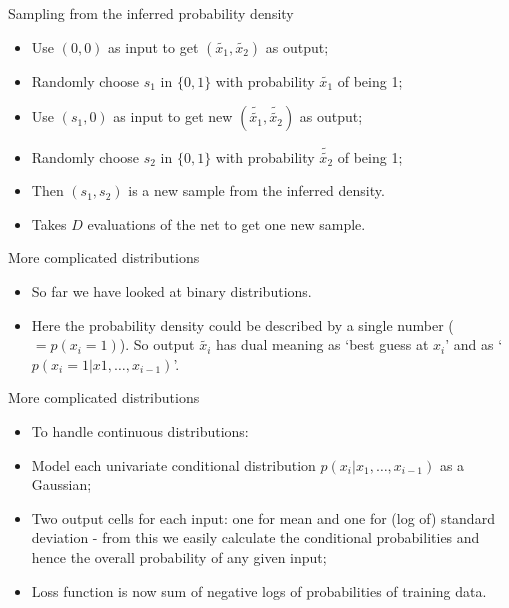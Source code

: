 \documentclass[usenames,dvipsnames]{beamer}
\begin{document}
\begin{frame}{Sampling from the inferred probability density}
    \begin{itemize}
      \item{Use $(0, 0)$ as input to get $(\tilde{x_1}, \tilde{x_2})$ as output;}
	\item{Randomly choose $s_1$ in $\{0, 1\}$ with probability $\tilde{x_1}$ of being 1;}
	\item{Use $(s_1, 0)$ as input to get new $(\tilde{\tilde{x_1}}, \tilde{\tilde{x_2}})$ as output;}
	\item{Randomly choose $s_2$ in $\{0, 1\}$ with probability $\tilde{\tilde{x_2}}$ of being 1;}
	\item{Then $(s_1, s_2)$ is a new sample from the inferred density.}
	\item{Takes $D$ evaluations of the net to get one new sample.}
    \end{itemize}
\end{frame}


\begin{frame}{More complicated distributions}
    \begin{itemize}
      \item{So far we have looked at binary distributions.}
	\item{Here the probability density could be described by a single number ($= p(x_i = 1)$). So output $\tilde{x_i}$ has dual meaning as `best guess at $x_i$' and as `$p(x_i = 1 | x1, \dots, x_{i-1})$'.}
    \end{itemize}
\end{frame}

\begin{frame}{More complicated distributions}
    \begin{itemize}
      \item{To handle continuous distributions:}
	\item{Model each univariate conditional distribution $p(x_i | x_1, \dots, x_{i-1})$ as a Gaussian;}
	\item{Two output cells for each input: one for mean and one for (log of) standard deviation - from this we easily calculate the conditional probabilities and hence the overall probability of any given input;}
	\item{Loss function is now sum of negative logs of probabilities of training data.}
    \end{itemize}
\end{frame}
\end{document}
